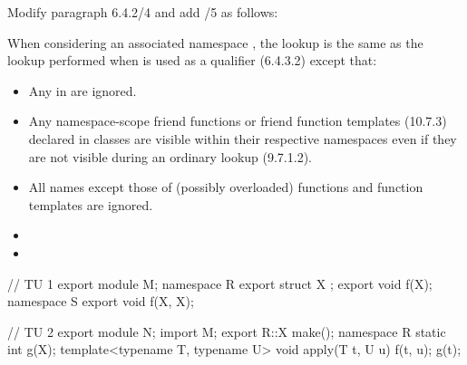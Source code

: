 Modify paragraph 6.4.2/4 and add /5 as follows:
\begin{std.txt}
  \pnum[4]
  When considering an associated namespace ,
  the lookup is the same as
  the lookup performed when 
   is used as a
  qualifier (6.4.3.2) except that:
  \begin{itemize}
    \item Any  in   are ignored.

     \item Any namespace-scope friend functions or friend
  function templates (10.7.3) declared in 
  classes 
  are visible within
  their respective namespaces even if they are not visible during an
  ordinary lookup (9.7.1.2).

     \item All names except those of (possibly overloaded) functions
  and function templates are ignored.

     \color{addclr}
     \item

    \item
  \end{itemize}

\pnum
\color{addclr}
\added{\enterexample}
\begin{codeblock}
// TU 1
export module M;
namespace R {
  export struct X {};
  export void f(X);
}
namespace S {
  export void f(X, X);
}
\end{codeblock}

\begin{codeblock}
// TU 2
export module N;
import M;
export R::X make();
namespace R { static int g(X); }
template<typename T, typename U> void apply(T t, U u) {
  f(t, u);
  g(t);
}
\end{codeblock}


\end{std.txt}
